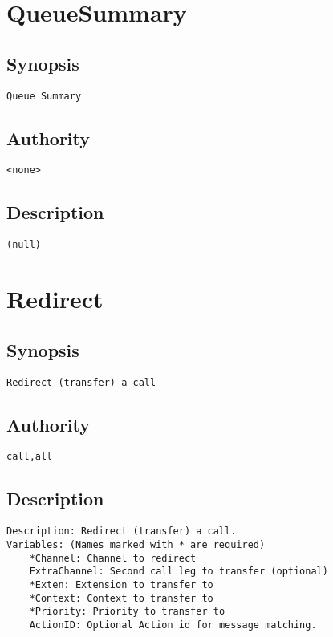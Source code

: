 \section{QueueSummary}
\subsection{Synopsis}
\begin{verbatim}
Queue Summary
\end{verbatim}
\subsection{Authority}
\begin{verbatim}
<none>
\end{verbatim}
\subsection{Description}
\begin{verbatim}
(null)
\end{verbatim}


\section{Redirect}
\subsection{Synopsis}
\begin{verbatim}
Redirect (transfer) a call
\end{verbatim}
\subsection{Authority}
\begin{verbatim}
call,all
\end{verbatim}
\subsection{Description}
\begin{verbatim}
Description: Redirect (transfer) a call.
Variables: (Names marked with * are required)
	*Channel: Channel to redirect
	ExtraChannel: Second call leg to transfer (optional)
	*Exten: Extension to transfer to
	*Context: Context to transfer to
	*Priority: Priority to transfer to
	ActionID: Optional Action id for message matching.

\end{verbatim}


